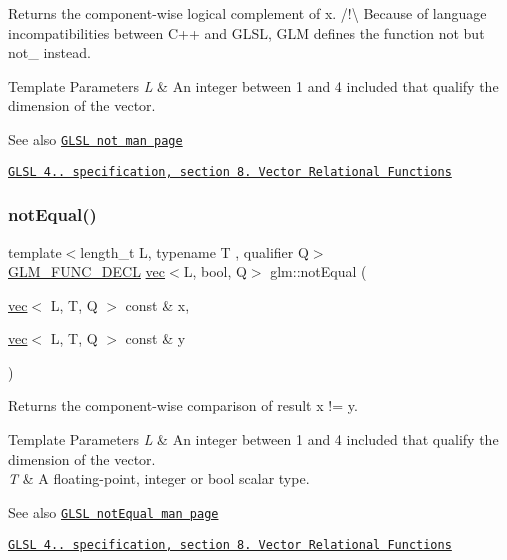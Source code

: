 Returns the component-\/wise logical complement of x. /!\textbackslash{} Because of language incompatibilities between C++ and G\+L\+SL, G\+LM defines the function not but not\+\_\+ instead.


\begin{DoxyTemplParams}{Template Parameters}
{\em L} & An integer between 1 and 4 included that qualify the dimension of the vector.\\
\hline
\end{DoxyTemplParams}
\begin{DoxySeeAlso}{See also}
\href{http://www.opengl.org/sdk/docs/manglsl/xhtml/not.xml}{\tt G\+L\+SL not man page} 

\href{http://www.opengl.org/registry/doc/GLSLangSpec.4.20.8.pdf}{\tt G\+L\+SL 4.. specification, section 8. Vector Relational Functions} 
\end{DoxySeeAlso}
\mbox{\label{group__core__func__vector__relational_gac5a72a973c81dc697dd8bb5d218e8251}} 
\subsubsection{\texorpdfstring{not\+Equal()}{notEqual()}}
{\footnotesize\ttfamily template$<$length\+\_\+t L, typename T , qualifier Q$>$ \\
\hyperlink{setup_8hpp_ab2d052de21a70539923e9bcbf6e83a51}{G\+L\+M\+\_\+\+F\+U\+N\+C\+\_\+\+D\+E\+CL} \hyperlink{structglm_1_1vec}{vec}$<$L, bool, Q$>$ glm\+::not\+Equal (\begin{DoxyParamCaption}\item[{\hyperlink{structglm_1_1vec}{vec}$<$ L, T, Q $>$ const \&}]{x,  }\item[{\hyperlink{structglm_1_1vec}{vec}$<$ L, T, Q $>$ const \&}]{y }\end{DoxyParamCaption})}

Returns the component-\/wise comparison of result x != y.


\begin{DoxyTemplParams}{Template Parameters}
{\em L} & An integer between 1 and 4 included that qualify the dimension of the vector. \\
\hline
{\em T} & A floating-\/point, integer or bool scalar type.\\
\hline
\end{DoxyTemplParams}
\begin{DoxySeeAlso}{See also}
\href{http://www.opengl.org/sdk/docs/manglsl/xhtml/notEqual.xml}{\tt G\+L\+SL not\+Equal man page} 

\href{http://www.opengl.org/registry/doc/GLSLangSpec.4.20.8.pdf}{\tt G\+L\+SL 4.. specification, section 8. Vector Relational Functions} 
\end{DoxySeeAlso}
